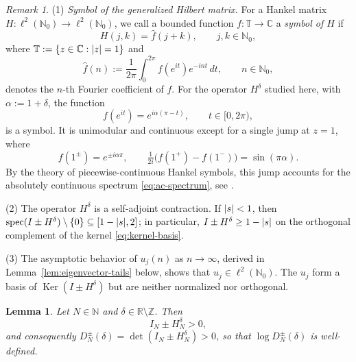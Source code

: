 \documentclass[11pt,a4paper,reqno]{amsart}
\newtheorem{lemma}[theorem]{Lemma}
\theoremstyle{remark}
\newtheorem{remark}[theorem]{Remark}
\newcommand{\Nzero}{\mathbb N_0}
\newcommand{\Ker}{\operatorname{Ker}}
\newcommand{\id}{I}
\DeclarePairedDelimiter{\abs}{\lvert}{\rvert}
\begin{document}
\begin{remark}
(1) \emph{Symbol of the generalized Hilbert matrix.} For a Hankel matrix $H:\ell^2(\Nzero)\to\ell^2(\Nzero)$, we call a bounded function
$f:\mathbb T\to\mathbb C$ a \emph{symbol of $H$} if
\begin{equation}
 H(j,k)=\hat f(j+k), \qquad j,k\in\Nzero,
\end{equation}
where $\mathbb T:=\{z\in\mathbb C:\abs{z}=1\}$ and
\begin{equation}
 \hat f(n):=\frac1{2\pi}\int_0^{2\pi}f(e^{it})e^{-int}\,dt, \qquad n\in\Nzero,
\end{equation}
denotes the $n$-th Fourier coefficient of $f$. For the operator $H^\delta$
studied here, with $\alpha:=1+\delta$, the function
\begin{equation}
 f(e^{it})=e^{i\alpha(\pi-t)}, \qquad t\in[0,2\pi),
\end{equation}
is a symbol. It is unimodular and continuous except for a single jump at
$z=1$, where
\begin{equation}
 f(1^\pm)=e^{\pm i\alpha\pi},\qquad
 \tfrac{1}{2i}\bigl(f(1^+)-f(1^-)\bigr)=\sin(\pi\alpha).
\end{equation}
By the theory of piecewise-continuous Hankel symbols, this jump
 accounts for the absolutely continuous spectrum \eqref{eq:ac-spectrum}, see \cite{Howland}.

(2) The operator $H^\delta$ is a self-adjoint contraction. If $\abs{s}<1$,
then $\operatorname{spec}(\id\pm H^\delta)\setminus\{0\}\subseteq[1-\abs{s},2]$;
in particular, $\id\pm H^\delta\ge1-\abs{s}$ on the orthogonal complement of
the kernel \eqref{eq:kernel-basis}.

(3) The asymptotic behavior of $u_j(n)$ as $n\to\infty$, derived in
Lemma~\ref{lem:eigenvector-tails} below, shows that
$u_j\in\ell^2(\Nzero)$. The $u_j$ form a basis of $\Ker(\id\pm H^\delta)$ but are neither normalized nor orthogonal.
\end{remark}

\begin{lemma}\label{lem:positivity}
Let $N\in\mathbb N$ and $\delta\in\mathbb R\setminus\mathbb Z$. Then
\begin{equation}
 \id_N\pm H_N^\delta>0,
\end{equation}
and consequently $D_N^\pm(\delta)=\det(\id_N\pm H_N^\delta)>0$, so that
$\log D_N^\pm(\delta)$ is well-defined.
\end{lemma}
\end{document}
